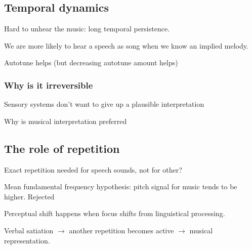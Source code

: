 \subsection{Temporal dynamics}
Hard to unhear the music: long temporal persistence.

We are more likely to hear a speech as song when we know an implied melody.

Autotune helps (but decreasing autotune amount helps)

\subsubsection{Why is it irreversible}
Sensory systems don't want to give up a plausible interpretation

Why is musical interpretation preferred

\subsection{The role of repetition}
Exact repetition needed for speech sounds, not for other?

Mean fundamental frequency hypothesis: pitch signal for music tends to be
higher. Rejected

Perceptual shift happens when focus shifts from linguistical processing.

Verbal satiation \(\to\) another repetition becomes active \(\to\) musical
representation.